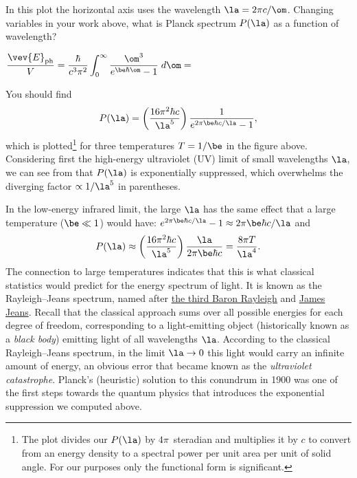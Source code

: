 In this plot the horizontal axis uses the wavelength $\la = 2\pi c / \om$.
Changing variables in your work above, what is Planck spectrum $P(\la)$ as a function of wavelength?
\begin{mdframed}
  $\displaystyle \frac{\vev{E}_{\text{ph}}}{V} = \frac{\hbar}{c^3 \pi^2} \int_0^{\infty} \frac{\om^3}{e^{\be \hbar \om} - 1} \; d\om = $ \\[120 pt] %
\end{mdframed}

You should find
\begin{equation}
  \label{eq:Planck_la}
  P(\la) = \left(\frac{16\pi^2 \hbar c}{\la^5}\right) \frac{1}{e^{2\pi\be \hbar c / \la} - 1},
\end{equation}
which is plotted\footnote{The plot divides our $P(\la)$ by $4\pi$~steradian and multiplies it by $c$ to convert from an energy density to a spectral power per unit area per unit of solid angle.  For our purposes only the functional form is significant.} for three temperatures $T = 1 / \be$ in the figure above.
Considering first the high-energy ultraviolet (UV) limit of small wavelengths $\la$, we can see from  that $P(\la)$ is exponentially suppressed, which overwhelms the diverging factor $\propto 1 / \la^5$ in parentheses.

In the low-energy infrared limit, the large $\la$ has the same effect that a large temperature ($\be \ll 1$) would have: $e^{2\pi\be \hbar c / \la} - 1 \approx 2\pi\be \hbar c / \la$ and
\begin{equation*}
  P(\la) \approx \left(\frac{16\pi^2 \hbar c}{\la^5}\right) \frac{\la}{2\pi\be \hbar c} = \frac{8\pi T}{\la^4}.
\end{equation*}
The connection to large temperatures indicates that this is what classical statistics would predict for the energy spectrum of light.
It is known as the Rayleigh--Jeans spectrum, named after \href{https://en.wikipedia.org/wiki/John_William_Strutt,_3rd_Baron_Rayleigh}{the third Baron Rayleigh} and \href{https://en.wikipedia.org/wiki/James_Jeans}{James Jeans}.
Recall that the classical approach sums over all possible energies for each degree of freedom, corresponding to a light-emitting object (historically known as a \textit{black body}) emitting light of all wavelengths $\la$.
According to the classical Rayleigh--Jeans spectrum, in the limit $\la \to 0$ this light would carry an infinite amount of energy, an obvious error that became known as the \textit{ultraviolet catastrophe}.
Planck's (heuristic) solution to this conundrum in 1900 was one of the first steps towards the quantum physics that introduces the exponential suppression we computed above.

